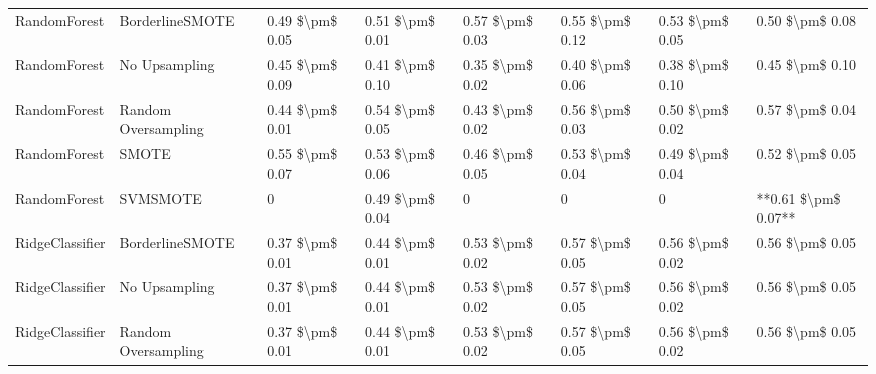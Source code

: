\begin{tabular}{llllllll}
                   RandomForest &               BorderlineSMOTE & 0.49 \$\textbackslash pm\$ 0.05 &           0.51 \$\textbackslash pm\$ 0.01 &       0.57 \$\textbackslash pm\$ 0.03 &        0.55 \$\textbackslash pm\$ 0.12 &                         0.53 \$\textbackslash pm\$ 0.05 &     0.50 \$\textbackslash pm\$ 0.08 \\
                   RandomForest &                 No Upsampling & 0.45 \$\textbackslash pm\$ 0.09 &           0.41 \$\textbackslash pm\$ 0.10 &       0.35 \$\textbackslash pm\$ 0.02 &        0.40 \$\textbackslash pm\$ 0.06 &                         0.38 \$\textbackslash pm\$ 0.10 &     0.45 \$\textbackslash pm\$ 0.10 \\
                   RandomForest &           Random Oversampling & 0.44 \$\textbackslash pm\$ 0.01 &           0.54 \$\textbackslash pm\$ 0.05 &       0.43 \$\textbackslash pm\$ 0.02 &        0.56 \$\textbackslash pm\$ 0.03 &                         0.50 \$\textbackslash pm\$ 0.02 &     0.57 \$\textbackslash pm\$ 0.04 \\
                   RandomForest &                         SMOTE & 0.55 \$\textbackslash pm\$ 0.07 &           0.53 \$\textbackslash pm\$ 0.06 &       0.46 \$\textbackslash pm\$ 0.05 &        0.53 \$\textbackslash pm\$ 0.04 &                         0.49 \$\textbackslash pm\$ 0.04 &     0.52 \$\textbackslash pm\$ 0.05 \\
                   RandomForest &                      SVMSMOTE &               0 &           0.49 \$\textbackslash pm\$ 0.04 &                     0 &                      0 &                                       0 & **0.61 \$\textbackslash pm\$ 0.07** \\
                RidgeClassifier &               BorderlineSMOTE & 0.37 \$\textbackslash pm\$ 0.01 &           0.44 \$\textbackslash pm\$ 0.01 &       0.53 \$\textbackslash pm\$ 0.02 &        0.57 \$\textbackslash pm\$ 0.05 &                         0.56 \$\textbackslash pm\$ 0.02 &     0.56 \$\textbackslash pm\$ 0.05 \\
                RidgeClassifier &                 No Upsampling & 0.37 \$\textbackslash pm\$ 0.01 &           0.44 \$\textbackslash pm\$ 0.01 &       0.53 \$\textbackslash pm\$ 0.02 &        0.57 \$\textbackslash pm\$ 0.05 &                         0.56 \$\textbackslash pm\$ 0.02 &     0.56 \$\textbackslash pm\$ 0.05 \\
                RidgeClassifier &           Random Oversampling & 0.37 \$\textbackslash pm\$ 0.01 &           0.44 \$\textbackslash pm\$ 0.01 &       0.53 \$\textbackslash pm\$ 0.02 &        0.57 \$\textbackslash pm\$ 0.05 &                         0.56 \$\textbackslash pm\$ 0.02 &     0.56 \$\textbackslash pm\$ 0.05 \\

\end{tabular}
